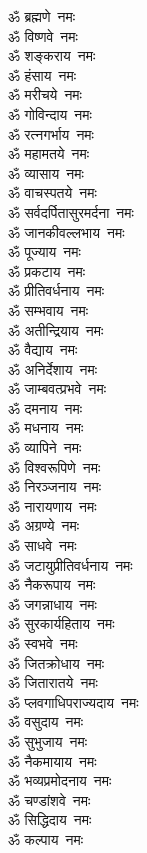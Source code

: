 \begin{multicols}{2}
\begin{flushleft}
ॐ ब्रह्मणे~नमः\\
ॐ विष्णवे~नमः\hfill{}\\
ॐ शङ्कराय~नमः\\
ॐ हंसाय~नमः\\
ॐ मरीचये~नमः\\
ॐ गोविन्दाय~नमः\\
ॐ रत्नगर्भाय~नमः\\
ॐ महामतये~नमः\\
ॐ व्यासाय~नमः\\
ॐ वाचस्पतये~नमः\\
ॐ सर्वदर्पितासुरमर्दना~नमः\\
ॐ जानकीवल्लभाय~नमः\hfill{}\\
ॐ पूज्याय~नमः\\
ॐ प्रकटाय~नमः\\
ॐ प्रीतिवर्धनाय~नमः\\
ॐ सम्भवाय~नमः\\
ॐ अतीन्द्रियाय~नमः\\
ॐ वैद्याय~नमः\\
ॐ अनिर्देशाय~नमः\\
ॐ जाम्बवत्प्रभवे~नमः\\
ॐ दमनाय~नमः\\
ॐ मधनाय~नमः\hfill{}\\
ॐ व्यापिने~नमः\\
ॐ विश्वरूपिणे~नमः\\
ॐ निरञ्जनाय~नमः\\
ॐ नारायणाय~नमः\\
ॐ अग्रण्ये~नमः\\
ॐ साधवे~नमः\\
ॐ जटायुप्रीतिवर्धनाय~नमः\\
ॐ नैकरूपाय~नमः\\
ॐ जगन्नाधाय~नमः\\
ॐ सुरकार्यहिताय~नमः\hfill{}\\
ॐ स्वभवे~नमः\\
ॐ जितक्रोधाय~नमः\\
ॐ जितारातये~नमः\\
ॐ प्लवगाधिपराज्यदाय~नमः\\
ॐ वसुदाय~नमः\\
ॐ सुभुजाय~नमः\\
ॐ नैकमायाय~नमः\\
ॐ भव्यप्रमोदनाय~नमः\\
ॐ चण्डांशवे~नमः\\
ॐ सिद्धिदाय~नमः\hfill{}\\
ॐ कल्पाय~नमः\\

\end{flushleft}
\end{multicols}

